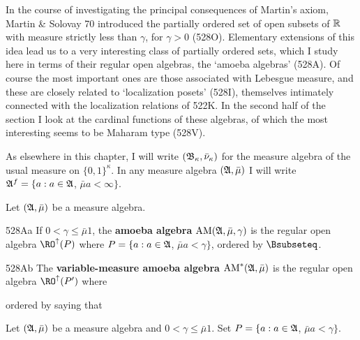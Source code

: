 
\def\chaptername{Cardinal functions of measure theory}
\def\sectionname{Amoeba algebras}

\def\AM{\mathop{\text{AM}}}


In the course of investigating the principal consequences of Martin's
axiom, {\smc Martin \& Solovay 70} introduced the partially ordered set
of open subsets of $\Bbb R$ with measure strictly less than $\gamma$,
for $\gamma>0$ (528O).   Elementary extensions of this idea lead us to a
very interesting class of partially ordered sets, which I study here in
terms of their regular open algebras, the `amoeba algebras' (528A).   Of
course the most important ones are those associated with Lebesgue
measure, and these are closely related to `localization posets'
(528I), themselves intimately connected with the localization relations of
522K.   In the second half of the section I look at the cardinal functions
of these algebras, of which the most interesting seems to be Maharam type
(528V).

As elsewhere in this chapter, I will write
$(\frak B_{\kappa},\bar\nu_{\kappa})$ for the measure algebra of the
usual measure on $\{0,1\}^{\kappa}$.   In any measure algebra
$(\frak A,\bar\mu)$
I will write $\frak A^f=\{a:a\in\frak A$, $\bar\mu a<\infty\}$.

Let $(\frak A,\bar\mu)$ be a measure algebra.

\spheader 528Aa If $0<\gamma\le\bar\mu 1$, the {\bf amoeba algebra}
$\AM(\frak A,\bar\mu,\gamma)$ is the regular open algebra
$\RO^{\uparrow}(P)$ where $P=\{a:a\in\frak A$, $\bar\mu a<\gamma\}$,
ordered by $\Bsubseteq$.

\spheader 528Ab
The {\bf variable-measure amoeba algebra}
$\AM^*(\frak A,\bar\mu)$ is the regular open
algebra $\RO^{\uparrow}(P')$ where


\noindent ordered by saying that


 Let $(\frak A,\bar\mu)$ be a measure algebra
and $0<\gamma\le\bar\mu 1$.   Set
$P=\{a:a\in\frak A$, $\bar\mu a<\gamma\}$.

